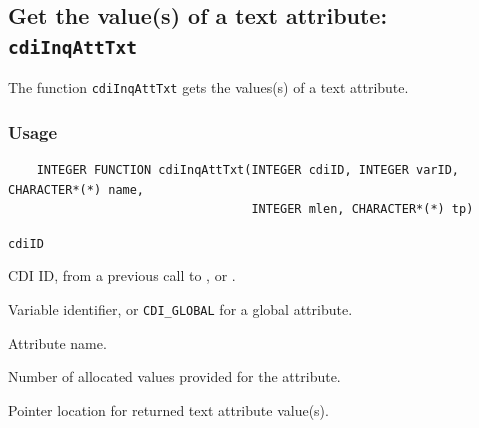 \subsection{Get the value(s) of a text attribute: \texttt{cdiInqAttTxt}}
\label{cdiInqAttTxt}

The function {\texttt{cdiInqAttTxt}} gets the values(s) of a text attribute.

\subsubsection*{Usage}

\begin{verbatim}
    INTEGER FUNCTION cdiInqAttTxt(INTEGER cdiID, INTEGER varID, CHARACTER*(*) name, 
                                  INTEGER mlen, CHARACTER*(*) tp)
\end{verbatim}

\hspace*{4mm}\begin{minipage}[]{15cm}
\begin{deflist}{\texttt{cdiID}\ }
\item[\texttt{cdiID}]
CDI ID, from a previous call to {}, {} or {}.
\item[\texttt{varID}]
Variable identifier, or {\texttt{CDI\_GLOBAL}} for a global attribute.
\item[\texttt{name}]
Attribute name.
\item[\texttt{mlen}]
Number of allocated values provided for the attribute.
\item[\texttt{tp}]
Pointer location for returned text attribute value(s).

\end{deflist}
\end{minipage}

